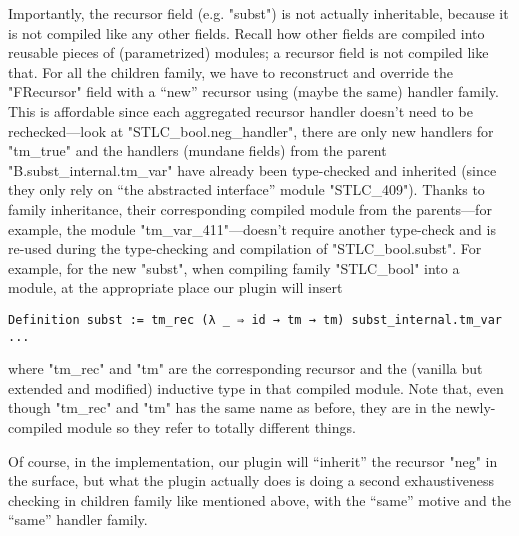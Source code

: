 Importantly, the recursor field (e.g. "subst") is not actually
inheritable, because it is not compiled like any other fields.
Recall how other fields are compiled into reusable pieces of
(parametrized) modules; a recursor field is not compiled like that.
For all the children family, we have to reconstruct and override the
"FRecursor" field with a ``new'' recursor using (maybe the same) handler
family.  This is affordable since each aggregated recursor handler
doesn't need to be rechecked---look at "STLC_bool.neg_handler", there
are only  new handlers for "tm_true" and the handlers (mundane fields)
from the parent "B.subst_internal.tm_var" have already been type-checked
and inherited (since they only rely on ``the abstracted interface''
module "STLC_409"). 
Thanks to family inheritance, their corresponding compiled module from the parents---for example, 
the module "tm_var_411"---doesn't require another type-check and is
re-used during the type-checking and compilation of "STLC_bool.subst".
For example, for the new "subst", when compiling family "STLC_bool" into
a module, at the appropriate place our plugin will insert
\begin{verbatim}
Definition subst := tm_rec (λ _ ⇒ id → tm → tm) subst_internal.tm_var ...
\end{verbatim}
where "tm_rec" and "tm" are the corresponding recursor and the (vanilla
but extended and modified) inductive type in that compiled module. Note
that, even though "tm_rec" and "tm" has the same name as before, they
are in the newly-compiled module so they refer to totally different
things. 





Of course, in the implementation, our plugin will ``inherit'' the
recursor "neg" in the surface,
but what the plugin actually does is doing a second exhaustiveness
checking in children family like mentioned above, with the ``same'' motive and the ``same'' handler family.



 






